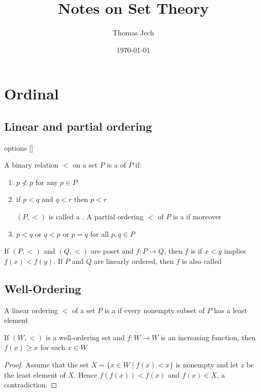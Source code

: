 \documentclass[11pt]{article}
\author{Thomas Jech}
\date{\today}
\title{Notes on Set Theory}
\begin{document}
\maketitle
\tableofcontents \clearpage
\section{Ordinal}
\label{sec:orge36a849}
\subsection{Linear and partial ordering}
\label{sec:org79321a7}
options []
\begin{definition}
A binary relation \(<\) on a set \(P\) is a  of \(P\) if:
\begin{enumerate}
\item \(p\not< p\) for any \(p\in P\)
\item if \(p<q\) and \(q<r\) then \(p<r\)

\((P,<)\) is called a . A partial ordering \(<\) of
\(P\) is a  if moreover
\item \(p<q\) or \(q<p\) or \(p=q\) for all \(p,q\in P\)
\end{enumerate}
\end{definition}


If \((P,<)\) and \((Q,<)\) are poset and \(f:P\to Q\), then \(f\) is
 if \(x<y\) implies \(f(x)<f(y)\). If \(P\) and \(Q\) are
linearly ordered, then \(f\) is also called 
\subsection{Well-Ordering}
\label{sec:org99304a3}
\begin{definition}[]
A linear ordering \(<\) of a set \(P\) is a  if every nonempty
subset of \(P\) has a least element
\end{definition}

\begin{lemma}[]
\label{lemma1}
If \((W,<)\) is a well-ordering set and \(f:W\to W\) is an increasing function,
then \(f(x)\ge x\) for each \(x\in W\)
\end{lemma}
\begin{proof}
Assume that the set \(X=\{x\in W\mid f(x)<x\}\) is nonempty and let \(z\) be the
least element of \(X\). Hence \(f(f(x))<f(x)\) and \(f(x)\in X\), a contradiction.
\end{proof}
\end{document}

